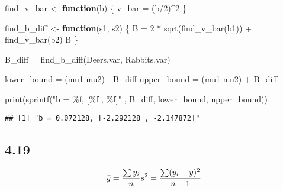 \documentclass[
]{article}
\newenvironment{Shaded}{\begin{snugshade}}{\end{snugshade}}
\newcommand{\ControlFlowTok}[1]{\textcolor[rgb]{0.13,0.29,0.53}{\textbf{#1}}}
\newcommand{\DecValTok}[1]{\textcolor[rgb]{0.00,0.00,0.81}{#1}}
\newcommand{\FunctionTok}[1]{\textcolor[rgb]{0.00,0.00,0.00}{#1}}
\newcommand{\NormalTok}[1]{#1}
\newcommand{\OtherTok}[1]{\textcolor[rgb]{0.56,0.35,0.01}{#1}}
\newcommand{\SpecialCharTok}[1]{\textcolor[rgb]{0.00,0.00,0.00}{#1}}
\newcommand{\StringTok}[1]{\textcolor[rgb]{0.31,0.60,0.02}{#1}}
\begin{document}
\begin{Shaded}
\begin{Highlighting}[]
\NormalTok{find\_v\_bar }\OtherTok{\textless{}{-}} \ControlFlowTok{function}\NormalTok{(b) \{}
\NormalTok{  v\_bar }\OtherTok{=}\NormalTok{ (b}\SpecialCharTok{/}\DecValTok{2}\NormalTok{)}\SpecialCharTok{\^{}}\DecValTok{2}
\NormalTok{\}}

\NormalTok{find\_b\_diff }\OtherTok{\textless{}{-}} \ControlFlowTok{function}\NormalTok{(s1, s2) \{}
\NormalTok{  B }\OtherTok{=} \DecValTok{2} \SpecialCharTok{*} \FunctionTok{sqrt}\NormalTok{(}\FunctionTok{find\_v\_bar}\NormalTok{(b1)) }\SpecialCharTok{+} \FunctionTok{find\_v\_bar}\NormalTok{(b2)}
\NormalTok{  B}
\NormalTok{\}}

\NormalTok{B\_diff }\OtherTok{=} \FunctionTok{find\_b\_diff}\NormalTok{(Deers.var, Rabbits.var)}

\NormalTok{lower\_bound }\OtherTok{=}\NormalTok{ (mu1}\SpecialCharTok{{-}}\NormalTok{mu2) }\SpecialCharTok{{-}}\NormalTok{ B\_diff}
\NormalTok{upper\_bound }\OtherTok{=}\NormalTok{ (mu1}\SpecialCharTok{{-}}\NormalTok{mu2) }\SpecialCharTok{+}\NormalTok{ B\_diff}

\FunctionTok{print}\NormalTok{(}\FunctionTok{sprintf}\NormalTok{(}\StringTok{"b = \%f, [\%f , \%f]"}\NormalTok{ , B\_diff, lower\_bound, upper\_bound))}
\end{Highlighting}
\end{Shaded}

\begin{verbatim}
## [1] "b = 0.072128, [-2.292128 , -2.147872]"
\end{verbatim}

\hypertarget{section-7}{%
\subsection{4.19}\label{section-7}}

\[
\bar{y} = \frac{\sum y_i}{n} \\
s^2 = \frac{\sum(y_i-\bar{y})^2}{n-1}
\]
\end{document}
